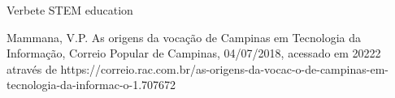 \documentclass[
12pt,		%
openright,	%
twoside,  %
a4paper,			%
chapter=TITLE,		%
english,			%
french,				%
spanish,			%
brazil				%
]{USPSC-classe/USPSC}
\begin{document}
\begin{flushleft}
\begin{flushleft}
\begin{flushleft}
\begin{flushleft}
\begin{flushleft}
\begin{flushleft}
\begin{flushleft}
\begin{flushleft}
\begin{flushleft}
[BRITANNICA, 2022a] Verbete STEM education
\end{flushleft}


\end{flushleft}


\end{flushleft}


\end{flushleft}


\end{flushleft}


\end{flushleft}


\end{flushleft}


\end{flushleft}


\end{flushleft}


\begin{flushleft}
\begin{flushleft}
\begin{flushleft}
\begin{flushleft}
\begin{flushleft}
\begin{flushleft}
\begin{flushleft}
\begin{flushleft}
\begin{flushleft}
[MAMMANA, 2018] Mammana, V.P. As origens da voca\c{c}\~ao de Campinas em Tecnologia da Informa\c{c}\~ao, Correio Popular de Campinas, 04/07/2018, acessado em 20222 atrav\'es de https://correio.rac.com.br/as-origens-da-vocac-o-de-campinas-em-tecnologia-da-informac-o-1.707672
\end{flushleft}


\end{flushleft}


\end{flushleft}


\end{flushleft}


\end{flushleft}


\end{flushleft}


\end{flushleft}


\end{flushleft}


\end{flushleft}
\end{document}
